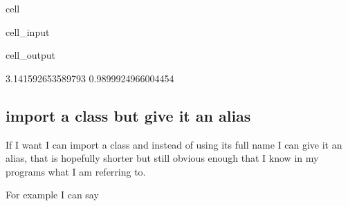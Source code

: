 \documentclass[letterpaper,10pt,english]{jupyterBook}
\begin{document}
\begin{sphinxuseclass}{cell}\begin{sphinxVerbatimInput}

\begin{sphinxuseclass}{cell_input}
\begin{sphinxVerbatim}[commandchars=\\\{\}]
   

\end{sphinxVerbatim}

\end{sphinxuseclass}\end{sphinxVerbatimInput}
\begin{sphinxVerbatimOutput}

\begin{sphinxuseclass}{cell_output}
\begin{sphinxVerbatim}[commandchars=\\\{\}]
3.141592653589793
\PYGZhy{}0.9899924966004454
\end{sphinxVerbatim}

\end{sphinxuseclass}\end{sphinxVerbatimOutput}

\end{sphinxuseclass}

\subsection{import a class but give it an alias}
\label{\detokenize{content/04_PythonEssentials/PythonPackagesEtc:import-a-class-but-give-it-an-alias}}
\sphinxAtStartPar
If I want I can import a class and instead of using its full name I can give it an alias, that is hopefully shorter but still obvious enough that I know in my programs what I am referring to.

\sphinxAtStartPar
For example I can say 
\end{document}
